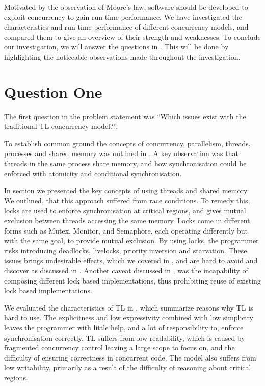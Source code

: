 \makeatletter {}\makeatother
{}
%
Motivated by the observation of Moore's law, software should be developed to exploit concurrency to gain run time performance. We have investigated the characteristics and run time performance of different concurrency models, and compared them to give an overview of their strength and weaknesses. To conclude our investigation, we will answer the questions in . This will be done by highlighting the noticeable observations made throughout the investigation.
\label{chap:conclusion}
\section{Question One}
The first question in the problem statement was ``Which issues exist with the traditional \ac{TL} concurrency model?''. 

To establish common ground the concepts of concurrency, parallelism, threads, processes and shared memory was outlined in . A key observation was that threads in the same process share memory, and how synchronisation could be enforced with atomicity and conditional synchronisation.

In section  we presented the key concepts of using threads and shared memory. We outlined, that this approach suffered from race conditions. To remedy this, locks are used to enforce synchronisation at critical regions, and gives mutual exclusion between threads accessing the same memory. Locks come in different forms such as Mutex, Monitor, and Semaphore, each operating differently but with the same goal, to provide mutual exclusion. By using locks, the programmer risks introducing deadlocks, livelocks, priority inversion and starvation. These issues brings undesirable effects, which we covered in , and are hard to avoid and discover as discussed in . Another caveat discussed in , was the incapability of composing different lock based implementations, thus prohibiting reuse of existing lock based implementations. 

We evaluated the characteristics of \ac{TL} in , which summarize reasons why \ac{TL} is hard to use. The explicitness and low expressivity combined with low simplicity leaves the programmer with little help, and a lot of responsibility to, enforce synchronisation correctly. \ac{TL} suffers from low readability, which is caused by fragmented concurrency control leaving a large scope to focus on, and the difficulty of ensuring correctness in concurrent code. The model also suffers from low writability, primarily as a result of the difficulty of reasoning about critical regions.

